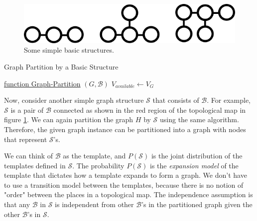 \documentclass[10pt, titlepage]{article}
\theoremstyle{definition}
\begin{document}
\begin{figure}[!htb]
    \centering
    \captionsetup{width=.8\linewidth}
    \includegraphics[scale=0.5]{images/example_basics.png}
    \caption{Some simple basic structures.}
    \label{fig:basic_struct}
\end{figure}

\begin{algorithm}
    \caption{Graph Partition by a Basic Structure}
    \label{alg:part_graph}

    \underline{function Graph-Partition} $(G, \mathcal{B})$\;
    $V_{available}\gets V_G$\;
\end{algorithm}

Now, consider another simple graph structure $\mathcal{S}$ that consists of $\mathcal{B}$. For example, $\mathcal{S}$ is a pair of $\mathcal{B}$ connected as shown in the red region of the topological map in figure \ref{fig:basic_struct}. We can again partition the graph $H$ by $\mathcal{S}$ using the same algorithm. Therefore, the given graph instance can be partitioned into a graph with nodes that represent $\mathcal{S}$'s.

We can think of $\mathcal{B}$ as the template, and $P(\mathcal{S})$ is the joint distribution of the templates defined in $\mathcal{S}$. The probability $P(\mathcal{S})$ is the \textit{expansion model} of the template that dictates how a template expands to form a graph. We don't have to use a transition model between the templates, because there is no notion of "order" between the places in a topological map. The independence assumption is that any $\mathcal{B}$ in $\mathcal{S}$ is independent from other $\mathcal{B}$'s in the partitioned graph given the other $\mathcal{B}$'s in $\mathcal{S}$.
\end{document}
